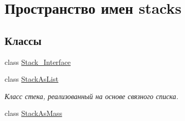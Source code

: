 \hypertarget{namespacestacks}{}\section{Пространство имен stacks}
\label{namespacestacks}
\subsection*{Классы}
\begin{DoxyCompactItemize}
\item 
class \hyperlink{classstacks_1_1_stack___interface}{Stack\+\_\+\+Interface}
\item 
class \hyperlink{classstacks_1_1_stack_as_list}{Stack\+As\+List}
\begin{DoxyCompactList}\small\item\em Класс стека, реализованный на основе связного списка. \end{DoxyCompactList}\item 
class \hyperlink{classstacks_1_1_stack_as_mass}{Stack\+As\+Mass}
\end{DoxyCompactItemize}
